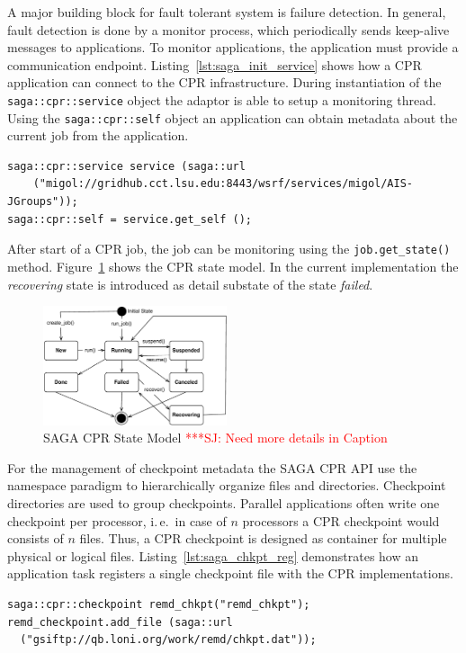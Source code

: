 \documentclass[times, 10pt,twocolumn]{article}
\newcommand{\jhanote}[1]{ {\textcolor{red} { ***SJ: #1 }}}
\begin{document}
A major building block for fault tolerant system is failure detection. In general, fault detection is done by a monitor process, 
which periodically sends keep-alive messages to applications. To monitor applications, the application must provide a communication endpoint.
Listing~\ref{lst:saga_init_service} shows how a CPR application can connect to the CPR infrastructure. During instantiation of the \texttt{saga::cpr::service} object the adaptor is able to setup a monitoring thread. Using the \texttt{saga::cpr::self} object an application can obtain metadata about the current job from the application.                                                                               
\begin{lstlisting}[style=myListing, caption={SAGA CPR: Initialize Migol Session}, label={lst:saga_init_service}]
saga::cpr::service service (saga::url 
    ("migol://gridhub.cct.lsu.edu:8443/wsrf/services/migol/AIS-JGroups"));
saga::cpr::self = service.get_self ();
\end{lstlisting}
      
After start of a CPR job, the job can be monitoring using the \texttt{job.get\_state()} method. Figure~\ref{fig:cpr-statemodel} shows the CPR state model. In the current implementation the \emph{recovering} state is introduced as detail substate of the state \emph{failed}.
\begin{figure}[th]
    \centering
        \includegraphics[width=0.48\textwidth]{cpr-statemodel.pdf}
    \caption{SAGA CPR State Model \jhanote{Need more details in Caption} }
    \label{fig:cpr-statemodel}
\end{figure}
                               

For the management of checkpoint metadata the SAGA CPR API use the namespace paradigm to hierarchically 
organize files and directories. Checkpoint directories are 
used to group checkpoints. Parallel applications often write one checkpoint per 
processor, i.\,e.\ in case of $n$ processors a CPR checkpoint
would consists of $n$ files. Thus, a CPR checkpoint is designed as container 
for multiple physical or logical files. Listing~\ref{lst:saga_chkpt_reg} demonstrates how an application task registers a single checkpoint file with the CPR implementations.     
\begin{lstlisting}[style=myListing, caption={SAGA CPR: Register Checkpoint with Migol}, label={lst:saga_chkpt_reg}]
saga::cpr::checkpoint remd_chkpt("remd_chkpt");
remd_checkpoint.add_file (saga::url 
  ("gsiftp://qb.loni.org/work/remd/chkpt.dat"));
\end{lstlisting}
                        
\end{document}
